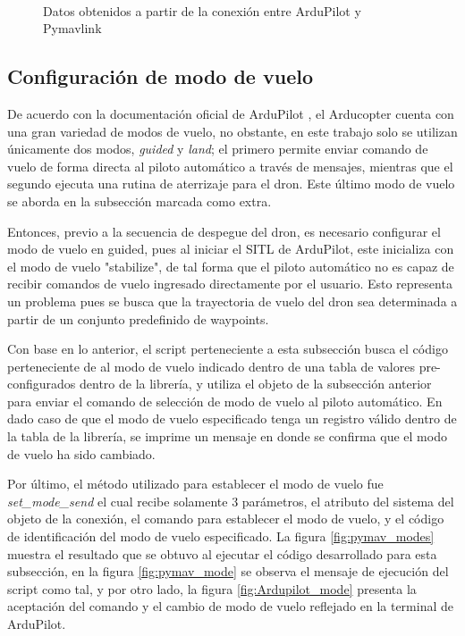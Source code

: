 \begin{figure}[ht]
    \centering
    \\
    \caption{Datos obtenidos a partir de la conexión entre ArduPilot y Pymavlink} 
    \label{fig:pymav_listen}
\end{figure}


\subsection{Configuración de modo de vuelo}

De acuerdo con la documentación oficial de ArduPilot \cite{Ardu_modes}, el Arducopter cuenta con una gran variedad de modos de vuelo, no obstante, en este trabajo solo se utilizan únicamente dos modos, \textit{guided} y \textit{land}; el primero permite enviar comando de vuelo de forma directa al piloto automático a través de mensajes, mientras que el segundo ejecuta una rutina de aterrizaje para el dron. Este último modo de vuelo se aborda en la subsección marcada como extra.

Entonces, previo a la secuencia de despegue del dron, es necesario configurar el modo de vuelo en guided, pues al iniciar el SITL de ArduPilot, este inicializa con el modo de vuelo "stabilize", de tal forma que el piloto automático no es capaz de recibir comandos de vuelo ingresado directamente por el usuario. Esto representa un problema pues se busca que la trayectoria de vuelo del dron sea determinada a partir de un conjunto predefinido de waypoints.

Con base en lo anterior, el script perteneciente a esta subsección busca el código perteneciente de al modo de vuelo indicado dentro de una tabla de valores pre-configurados dentro de la librería, y utiliza el objeto de la subsección anterior para enviar el comando de selección de modo de vuelo al piloto automático. En dado caso de que el modo de vuelo especificado tenga un registro válido dentro de la tabla de la librería, se imprime un mensaje en donde se confirma que el modo de vuelo ha sido cambiado.

Por último, el método utilizado para establecer el modo de vuelo fue \textit{set\_mode\_send} el cual recibe solamente 3 parámetros, el atributo del sistema del objeto de la conexión, el comando para establecer el modo de vuelo, y el código de identificación del modo de vuelo especificado. La figura \ref{fig:pymav_modes} muestra el resultado que se obtuvo al ejecutar el código desarrollado para esta subsección, en la figura \ref{fig:pymav_mode} se observa el mensaje de ejecución del script como tal, y por otro lado, la figura \ref{fig:Ardupilot_mode} presenta la aceptación del comando y el cambio de modo de vuelo reflejado en la terminal de ArduPilot.


